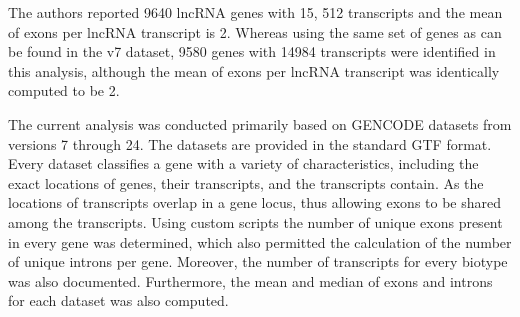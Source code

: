 \documentclass[ncrna,article,submit,moreauthors,pdftex,10pt,a4paper]{mdpi}
\begin{document}
The authors reported 9640 lncRNA genes with 15, 512 transcripts and the mean of exons per lncRNA transcript is 2.
Whereas using the same set of genes as can be found in the v7 dataset, 9580 genes with 14984 transcripts were identified in this analysis, although 
the mean of exons per lncRNA transcript was identically computed to be 2.
\begin{figure}[hl]
\end{figure}
\begin{figure}[hl]
 \centering
\end{figure}

The current analysis was conducted primarily based on GENCODE datasets from versions 7 through 24. 
The datasets are provided in the standard GTF format. Every dataset classifies a gene with a variety of characteristics, including
the exact locations of genes, their transcripts, and the transcripts contain. As the locations of transcripts overlap in a
gene locus, thus allowing exons to be shared among the transcripts.
Using custom scripts the number of unique exons present in every gene was determined, which also permitted the calculation
of the number of unique introns per gene. Moreover, the number of transcripts for every biotype was also documented.
Furthermore, the mean and median of exons and introns for each dataset was also computed.
\begin{figure}[hl]
\end{figure}
  
\end{document}
